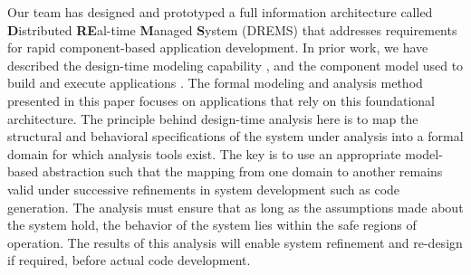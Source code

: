 Our team has designed and prototyped a full information architecture called \textbf{D}istributed \textbf{RE}al-time \textbf{M}anaged \textbf{S}ystem (DREMS) \cite{ISIS_F6_Aerospace:12,DREMS13Software} that addresses requirements for rapid component-based application development. In prior work, we have described the design-time modeling capability \cite{ISIS_F6_SFFMT:13}, and the component model used to build and execute applications \cite{ISIS_F6_ISORC:13}.
The formal modeling and analysis method presented in this paper focuses on applications that rely on this foundational architecture. The principle behind design-time analysis here is to map the structural and behavioral specifications of the system under analysis into a formal domain for which analysis tools exist. The key is to use an appropriate model-based abstraction such that the mapping from one domain to another remains valid under successive refinements in system development such as code generation. 
The analysis must ensure that as long as the assumptions made about the system hold, the behavior of the system lies within the safe regions of operation.  The results of this analysis will enable system refinement and re-design if required, before actual code development. 


